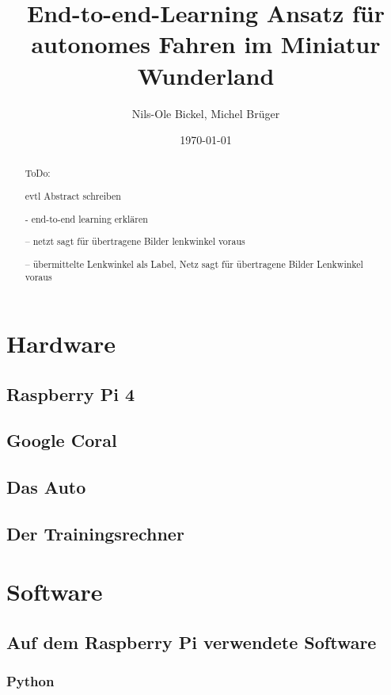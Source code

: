 \documentclass[a4paper, 12pt]{scrartcl}
\title{End-to-end-Learning Ansatz für autonomes Fahren im Miniatur Wunderland}
\author{Nils-Ole Bickel, Michel Brüger}
\date{\today}
\begin{document}
	
\maketitle
	
\tableofcontents

\newpage
	
	\begin{abstract}
ToDo: 

evtl Abstract schreiben	

- end-to-end learning erklären

-- netzt sagt für übertragene Bilder lenkwinkel voraus

-- übermittelte Lenkwinkel als Label, Netz sagt für übertragene Bilder Lenkwinkel voraus
	\end{abstract}

	\section{Hardware}
		\subsection{Raspberry Pi 4}
		\subsection{Google Coral}
		\subsection{Das Auto}
		\subsection{Der Trainingsrechner}
	
	\section{Software}
		\subsection{Auf dem Raspberry Pi verwendete Software}
			\subsubsection{Python}
\end{document}
